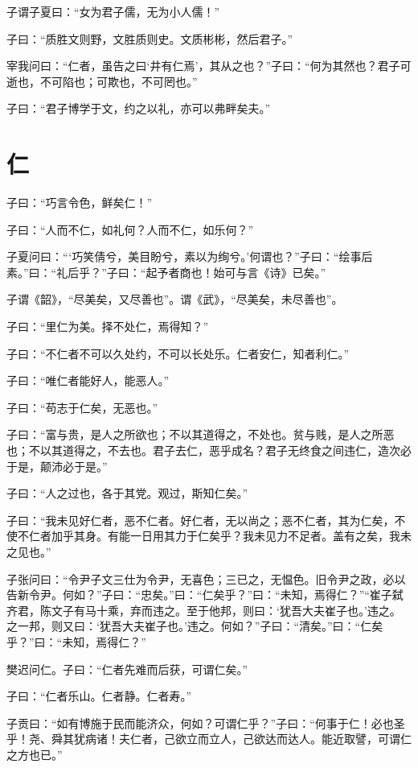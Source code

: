 \documentclass[a5paper]{ctexbook}
\begin{document}
    子谓子夏曰：“女为君子儒，无为小人儒！”

    子曰：“质胜文则野，文胜质则史。文质彬彬，然后君子。”

    宰我问曰：“仁者，虽告之曰‘井有仁焉’，其从之也？”子曰：“何为其然也？君子可逝也，不可陷也；可欺也，不可罔也。”

    子曰：“君子博学于文，约之以礼，亦可以弗畔矣夫。”

    \chapter{仁}

    子曰：“巧言令色，鲜矣仁！”

    子曰：“人而不仁，如礼何？人而不仁，如乐何？”

    子夏问曰：“‘巧笑倩兮，美目盼兮，素以为绚兮。’何谓也？”子曰：“绘事后素。”曰：“礼后乎？”子曰：“起予者商也！始可与言《诗》已矣。”

    子谓《韶》，“尽美矣，又尽善也”。谓《武》，“尽美矣，未尽善也”。

    子曰：“里仁为美。择不处仁，焉得知？”

    子曰：“不仁者不可以久处约，不可以长处乐。仁者安仁，知者利仁。”

    子曰：“唯仁者能好人，能恶人。”

    子曰：“苟志于仁矣，无恶也。”

    子曰：“富与贵，是人之所欲也；不以其道得之，不处也。贫与贱，是人之所恶也；不以其道得之，不去也。君子去仁，恶乎成名？君子无终食之间违仁，造次必于是，颠沛必于是。”

    子曰：“人之过也，各于其党。观过，斯知仁矣。”

    子曰：“我未见好仁者，恶不仁者。好仁者，无以尚之；恶不仁者，其为仁矣，不使不仁者加乎其身。有能一日用其力于仁矣乎？我未见力不足者。盖有之矣，我未之见也。”

    子张问曰：“令尹子文三仕为令尹，无喜色；三已之，无愠色。旧令尹之政，必以告新令尹。何如？”子曰：“忠矣。”曰：“仁矣乎？”曰：“未知，焉得仁？”“崔子弑齐君，陈文子有马十乘，弃而违之。至于他邦，则曰：‘犹吾大夫崔子也。’违之。之一邦，则又曰：‘犹吾大夫崔子也。’违之。何如？”子曰：“清矣。”曰：“仁矣乎？”曰：“未知，焉得仁？”

    樊迟问仁。子曰：“仁者先难而后获，可谓仁矣。”

    子曰：“仁者乐山。仁者静。仁者寿。”

    子贡曰：“如有博施于民而能济众，何如？可谓仁乎？”子曰：“何事于仁！必也圣乎！尧、舜其犹病诸！夫仁者，己欲立而立人，己欲达而达人。能近取譬，可谓仁之方也已。”
\end{document}
